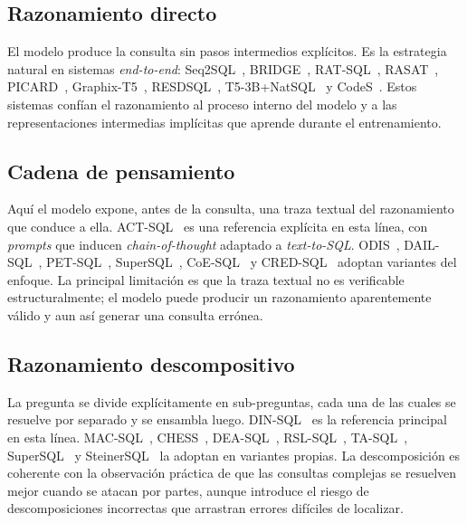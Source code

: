 \subsection{Razonamiento directo}
\label{subsec:sota-d5-directo}

El modelo produce la consulta sin pasos intermedios explícitos. Es la
estrategia natural en sistemas \emph{end-to-end}:
Seq2SQL~\cite{Seq2SQL2017}, BRIDGE~\cite{BRIDGE2020},
RAT-SQL~\cite{RAT-SQL2021}, RASAT~\cite{RASAT2022},
PICARD~\cite{PICARD2022}, Graphix-T5~\cite{Graphix-T52022},
RESDSQL~\cite{RESDSQL2023}, T5-3B+NatSQL~\cite{T5-3B+NatSQL+TokenPreprocessing2023}
y CodeS~\cite{CodeS2024}. Estos sistemas confían el razonamiento al
proceso interno del modelo y a las representaciones intermedias
implícitas que aprende durante el entrenamiento.

\subsection{Cadena de pensamiento}
\label{subsec:sota-d5-cot}

Aquí el modelo expone, antes de la consulta, una traza textual del
razonamiento que conduce a ella. ACT-SQL~\cite{ACT-SQL2023} es una
referencia explícita en esta línea, con \emph{prompts} que inducen
\emph{chain-of-thought} adaptado a \emph{text-to-SQL}.
ODIS~\cite{ODIS2023}, DAIL-SQL~\cite{DAIL-SQL2023},
PET-SQL~\cite{PET-SQL2024}, SuperSQL~\cite{SuperSQL2024},
CoE-SQL~\cite{CoE-SQL2024} y CRED-SQL~\cite{CRED-SQL2025} adoptan
variantes del enfoque. La principal limitación es que la traza textual
no es verificable estructuralmente; el modelo puede producir un
razonamiento aparentemente válido y aun así generar una consulta
errónea.

\subsection{Razonamiento descompositivo}
\label{subsec:sota-d5-descompositivo}

La pregunta se divide explícitamente en sub-preguntas, cada una de las
cuales se resuelve por separado y se ensambla luego.
DIN-SQL~\cite{DIN-SQL2023} es la referencia principal en esta línea.
MAC-SQL~\cite{MAC-SQL2023}, CHESS~\cite{CHESS2024},
DEA-SQL~\cite{DEA-SQL2024}, RSL-SQL~\cite{RSL-SQL2024},
TA-SQL~\cite{TA-SQL2024}, SuperSQL~\cite{SuperSQL2024} y
SteinerSQL~\cite{SteinerSQL2025} la adoptan en variantes propias. La
descomposición es coherente con la observación práctica de que las
consultas complejas se resuelven mejor cuando se atacan por partes,
aunque introduce el riesgo de descomposiciones incorrectas que
arrastran errores difíciles de localizar.

